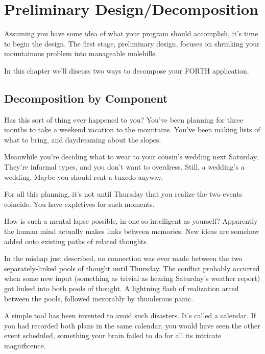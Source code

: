 \chapter{Preliminary Design/\allowhyphens Decomposition}

Assuming you have some idea of what your program should accomplish,
it's time to begin the design. The first stage, preliminary design, focuses
on shrinking your mountainous problem into manageable molehills.

In this chapter we'll discuss two ways to decompose your FORTH
application.

\section{Decomposition by Component}

Has this sort of thing ever happened to you? You've been planning for
three months to take a weekend vacation to the mountains. You've been
making lists of what to bring, and daydreaming about the slopes.

Meanwhile you're deciding what to wear to your cousin's wedding
next Saturday. They're informal types, and you don't want to overdress.
Still, a wedding's a wedding. Maybe you should rent a tuxedo anyway.

For all this planning, it's not until Thursday that you realize the
two events coincide. You have expletives for such moments.

How is such a mental lapse possible, in one so intelligent as
yourself? Apparently the human mind actually makes links between
memories. New ideas are somehow added onto existing paths of related
thoughts.


In the mishap just described, no connection was ever made between the
two separately-linked pools of thought until Thursday.  The conflict
probably occurred when some new input (something as trivial as hearing
Saturday's weather report) got linked into both pools of thought. A
lightning flash of realization arced between the pools, followed
inexorably by thunderous panic.

A simple tool has been invented to avoid such disasters. It's called a
calendar. If you had recorded both plans in the same calendar, you would
have seen the other event scheduled, something your brain failed to do
for all its intricate magnificence.

